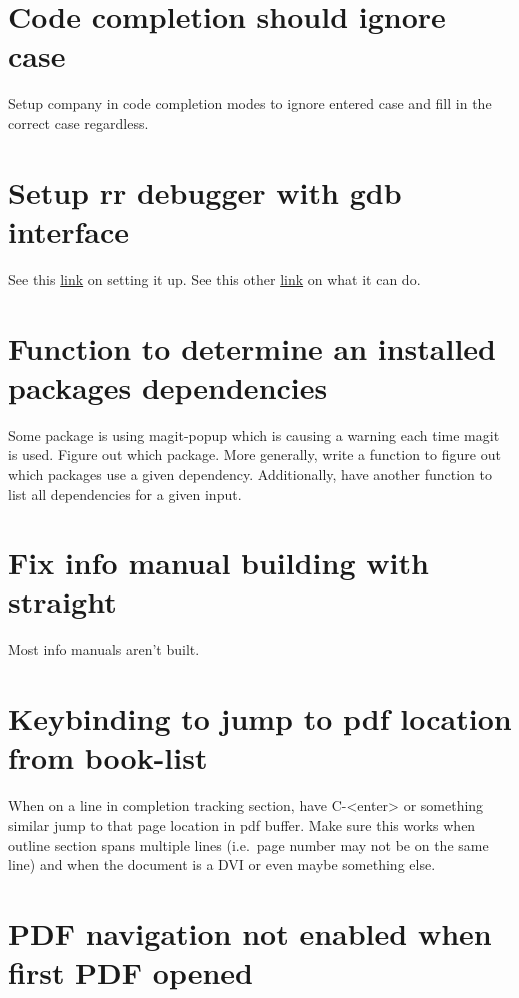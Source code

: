 \documentclass{default}
\begin{document}
\section{Code completion should ignore case}

Setup company in code completion modes to ignore entered case and fill in the correct case
regardless.

\section{Setup rr debugger with gdb interface}

See this
\href{https://emacs.stackexchange.com/questions/20056/is-it-possible-to-use-mozillas-rr-with-gdb-multi-window?rq=1}{link}
on setting it up. See this other
\href{http://fitzgeraldnick.com/2015/11/02/back-to-the-futurre.html}{link} on what it can do.

\section{Function to determine an installed packages dependencies}

Some package is using magit-popup which is causing a warning each time magit is used. Figure out
which package. More generally, write a function to figure out which packages use a given
dependency. Additionally, have another function to list all dependencies for a given input.

\section{Fix info manual building with straight}

Most info manuals aren't built.

\section{Keybinding to jump to pdf location from book-list}

When on a line in completion tracking section, have C-<enter> or something similar jump to that page
location in pdf buffer. Make sure this works when outline section spans multiple lines (i.e.\ page
number may not be on the same line) and when the document is a DVI or even maybe something else.

\section{PDF navigation not enabled when first PDF opened}
\end{document}

